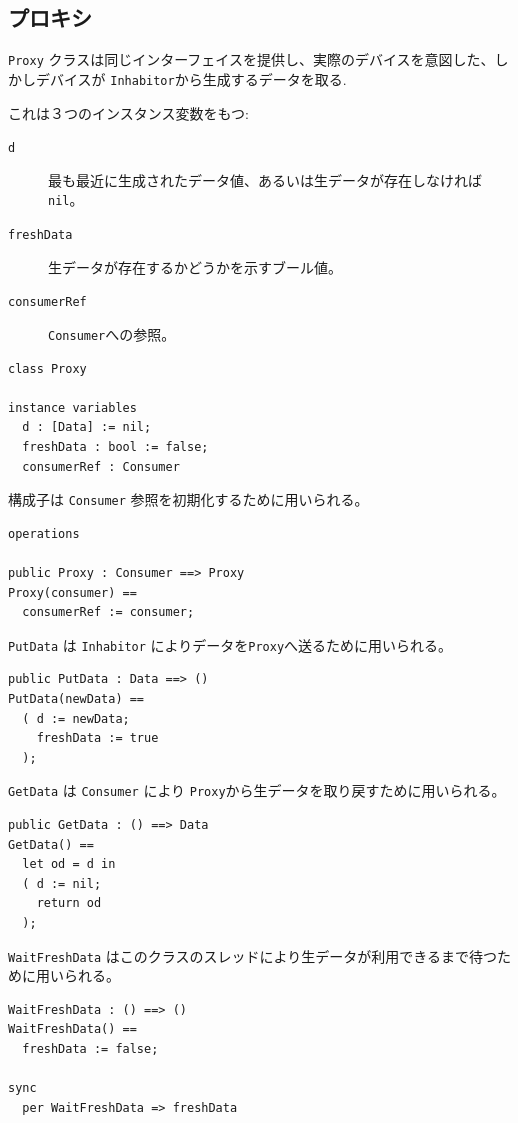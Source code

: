 \documentclass[\pformat,12pt]{jreport}
\begin{document}
\subsection{プロキシ}

 \texttt{Proxy} クラスは同じインターフェイスを提供し、実際のデバイスを意図した、しかしデバイスが \texttt{Inhabitor}から生成するデータを取る.

これは３つのインスタンス変数をもつ:

\begin{description}
\item[\texttt{d}] 最も最近に生成されたデータ値、あるいは生データが存在しなければ　\texttt{nil}。
\item[\texttt{freshData}] 生データが存在するかどうかを示すブール値。
\item[\texttt{consumerRef}]  \texttt{Consumer}への参照。
\end{description}

\begin{lstlisting}
class Proxy

instance variables
  d : [Data] := nil;
  freshData : bool := false;
  consumerRef : Consumer
\end{lstlisting}

構成子は \texttt{Consumer} 参照を初期化するために用いられる。

\begin{lstlisting}
operations

public Proxy : Consumer ==> Proxy
Proxy(consumer) ==
  consumerRef := consumer;
\end{lstlisting}

\texttt{PutData} は \texttt{Inhabitor} によりデータを\texttt{Proxy}へ送るために用いられる。

\begin{lstlisting}
public PutData : Data ==> ()
PutData(newData) ==
  ( d := newData;
    freshData := true
  );
\end{lstlisting}

\texttt{GetData} は \texttt{Consumer} により \texttt{Proxy}から生データを取り戻すために用いられる。

\begin{lstlisting}
public GetData : () ==> Data
GetData() ==
  let od = d in
  ( d := nil;
    return od
  );
\end{lstlisting}

\texttt{WaitFreshData} はこのクラスのスレッドにより生データが利用できるまで待つために用いられる。

\begin{lstlisting}
WaitFreshData : () ==> ()
WaitFreshData() ==
  freshData := false;

sync
  per WaitFreshData => freshData
\end{lstlisting}
\end{document}
